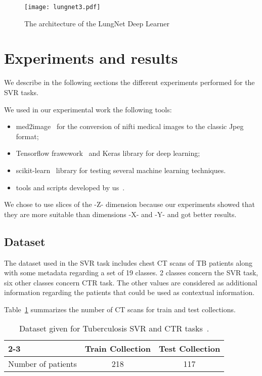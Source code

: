 \begin{figure}
\center
\texttt{[image: lungnet3.pdf]}
\caption{The architecture of the LungNet Deep Learner} 
\label{fig:lungnet}
\end{figure}

\section{Experiments and results}
We describe in the following sections the different experiments performed for the SVR tasks. 

We used in our experimental work the following tools:
\begin{itemize}
\item med2image~\cite{med2image} for the conversion of nifti medical images to the classic Jpeg format;
\item Tensorflow frawework~\cite{tensorflow} and Keras library for deep learning;
\item scikit-learn~\cite{scikit-learn} library for testing several machine learning techniques.
\item tools and scripts developed by us~\cite{anouargit}.
\end{itemize}

We chose to use slices of the -Z- dimension because our experiments showed that they are more suitable than dimensions -X- and -Y- and got better results.

\subsection{Dataset}
The dataset used in the SVR task includes chest CT scans of TB patients along with some metadata regarding a set of 19 classes. 2 classes concern the SVR task, six other classes concern CTR task. The other values are considered as additional information regarding the patients that could be used as contextual information.

Table~\ref{tab1} summarizes the number of CT scans for train and test collections.

\begin{table}
\center
\caption{Dataset given for Tuberculosis SVR and CTR tasks~\cite{ImageCLEF19}.}
\label{tab1}
\begin{tabular}{|l|c|c|}
\cline{2-3}
\multicolumn{1}{}{}  &     \multicolumn{1}{|c|}{Train Collection}  &    \multicolumn{1}{|c|}{Test Collection}  \\
\hline
Number of patients             &    218                     &        117\\
\hline
\end{tabular}
\end{table}


